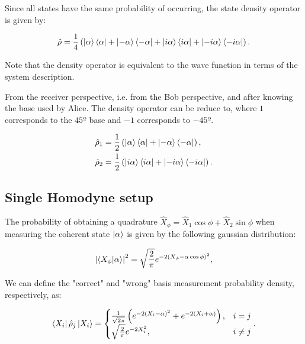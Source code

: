 \documentclass[a4paper]{article}
\begin{document}
Since all states have the same probability of occurring, the state density operator is given by:

\begin{equation}\label{eq:statedensity}
\hat{\rho}=\frac{1}{4}\left(\ket{\alpha}\bra{\alpha}+\ket{-\alpha}\bra{-\alpha}+\ket{i\alpha}\bra{i\alpha}+\ket{-i\alpha}\bra{-i\alpha}\right).
\end{equation}

Note that the density operator is equivalent to the wave function in terms of the system description.

From the receiver perspective, i.e. from the Bob perspective, and after knowing the base used by Alice.
The density operator can be reduce to, where $1$ corresponds to the $45º$ base and $-1$ corresponds to $-45º$.

\begin{align}
\hat{\rho}_1&=\frac{1}{2}\left(\ket{\alpha}\bra{\alpha}+\ket{-\alpha}\bra{-\alpha}\right),\label{eq:statedensity1} \\
\hat{\rho}_2&=\frac{1}{2}\left(\ket{i\alpha}\bra{i\alpha}+\ket{-i\alpha}\bra{-i\alpha}\right).\label{eq:statedensity2}
\end{align}

\subsection{Single Homodyne setup}

The probability of obtaining a quadrature $\hat{X}_\phi=\hat{X}_1\cos\phi+\hat{X}_2\sin\phi$ when measuring the coherent state $\ket{\alpha}$ is given by the following gaussian distribution:

\begin{equation}
\left|\braket{X_\phi|\alpha}\right|^2=\sqrt{\frac{2}{\pi}}e^{-2(X_\phi-\alpha\cos\phi)^2},
\end{equation}

We can define the "correct" and "wrong" basis measurement probability density, respectively, as:

\begin{equation}\label{eq:probdensity}
\bra{X_i}\hat{\rho}_j\ket{X_i}=
\begin{cases}
\frac{1}{\sqrt{2\pi}}\left(e^{-2(X_i-\alpha)^2}+e^{-2(X_i+\alpha)}\right), & i=j\\
\sqrt{\frac{2}{\pi}}e^{-2X_i^2}, &i\neq j
\end{cases}.
\end{equation}
\end{document}
